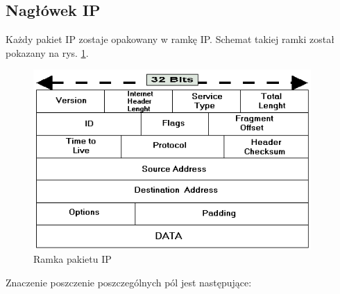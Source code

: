 \documentclass[a4paper,12pt,oneside]{book}
\begin{document}
		\subsection{Nagłówek IP}
			Każdy pakiet IP zostaje opakowany w ramkę IP.
			Schemat takiej ramki został pokazany na rys. \ref{fig:ramka_ip}.
			\begin{figure}[h]
				\centering
				\includegraphics[width=400px]{ip.png}
				\caption{Ramka pakietu IP}
				\label{fig:ramka_ip}
			\end{figure}
			Znaczenie poszczenie poszczególnych pól jest następujące:
\end{document}
